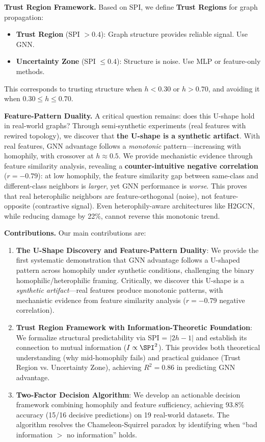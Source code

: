 \textbf{Trust Region Framework.} Based on SPI, we define \textbf{Trust Regions} for graph propagation:
\begin{itemize}
    \item \textbf{Trust Region} (SPI $> 0.4$): Graph structure provides reliable signal. Use GNN.
    \item \textbf{Uncertainty Zone} (SPI $\leq 0.4$): Structure is noise. Use MLP or feature-only methods.
\end{itemize}
This corresponds to trusting structure when $h < 0.30$ or $h > 0.70$, and avoiding it when $0.30 \leq h \leq 0.70$.

\textbf{Feature-Pattern Duality.} A critical question remains: does this U-shape hold in real-world graphs? Through semi-synthetic experiments (real features with rewired topology), we discover that \textbf{the U-shape is a synthetic artifact}. With real features, GNN advantage follows a \textit{monotonic} pattern---increasing with homophily, with crossover at $h \approx 0.5$. We provide mechanistic evidence through feature similarity analysis, revealing a \textbf{counter-intuitive negative correlation} ($r = -0.79$): at low homophily, the feature similarity gap between same-class and different-class neighbors is \textit{larger}, yet GNN performance is \textit{worse}. This proves that real heterophilic neighbors are feature-orthogonal (noise), not feature-opposite (contrastive signal). Even heterophily-aware architectures like H2GCN, while reducing damage by 22\%, cannot reverse this monotonic trend.

\textbf{Contributions.} Our main contributions are:
\begin{enumerate}
    \item \textbf{The U-Shape Discovery and Feature-Pattern Duality}: We provide the first systematic demonstration that GNN advantage follows a U-shaped pattern across homophily under synthetic conditions, challenging the binary homophilic/heterophilic framing. Critically, we discover this U-shape is a \textit{synthetic artifact}---real features produce monotonic patterns, with mechanistic evidence from feature similarity analysis ($r = -0.79$ negative correlation).

    \item \textbf{Trust Region Framework with Information-Theoretic Foundation}: We formalize structural predictability via SPI = $|2h-1|$ and establish its connection to mutual information ($I \propto \SPI^2$). This provides both theoretical understanding (why mid-homophily fails) and practical guidance (Trust Region vs. Uncertainty Zone), achieving $R^2 = 0.86$ in predicting GNN advantage.

    \item \textbf{Two-Factor Decision Algorithm}: We develop an actionable decision framework combining homophily and feature sufficiency, achieving 93.8\% accuracy (15/16 decisive predictions) on 19 real-world datasets. The algorithm resolves the Chameleon-Squirrel paradox by identifying when ``bad information $>$ no information'' holds.
\end{enumerate}

